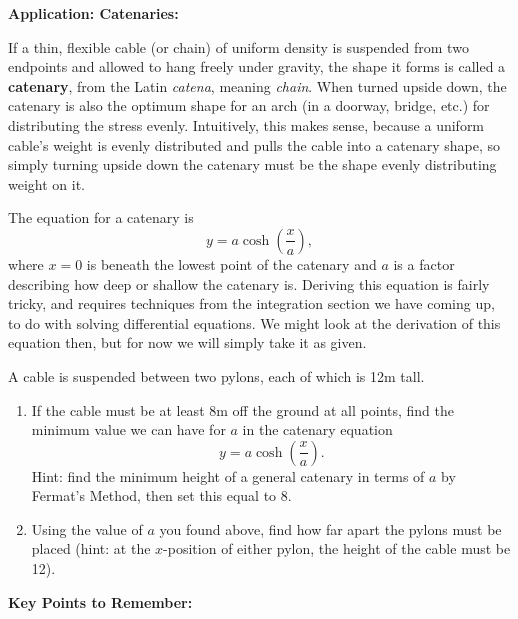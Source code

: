 \documentclass{article}
\begin{document}
\clearpage



\textbf{Application: Catenaries:}\bigskip



If a thin, flexible cable (or chain) of uniform density is suspended from two endpoints and allowed to hang freely under gravity, the shape it forms is called a \textbf{catenary}, from the Latin \textit{catena}, meaning \textit{chain}. When turned upside down, the catenary is also the optimum shape for an arch (in a doorway, bridge, etc.) for distributing the stress evenly. Intuitively, this makes sense, because a uniform cable's weight is evenly distributed and pulls the cable into a catenary shape, so simply turning upside down the catenary must be the shape evenly distributing weight on it.

The equation for a catenary is
\[y=a\cosh\left(\frac{x}{a}\right),\]
where $x=0$ is beneath the lowest point of the catenary and $a$ is a factor describing how deep or shallow the catenary is. Deriving this equation is fairly tricky, and requires techniques from the integration section we have coming up, to do with solving differential equations. We might look at the derivation of this equation then, but for now we will simply take it as given.\bigskip


 A cable is suspended between two pylons, each of which is 12m tall.
 
\begin{enumerate}
	\item If the cable must be at least 8m off the ground at all points, find the minimum value we can have for $a$ in the catenary equation
		\[y=a\cosh\left(\frac{x}{a}\right).\]
		Hint: find the minimum height of a general catenary in terms of $a$ by Fermat's Method, then set this equal to 8.
	\item Using the value of $a$ you found above, find how far apart the pylons must be placed (hint: at the $x$-position of either pylon, the height of the cable must be 12).
\end{enumerate}

\clearpage








{\bf Key Points to Remember:}

\vspace{5mm}
\end{document}
